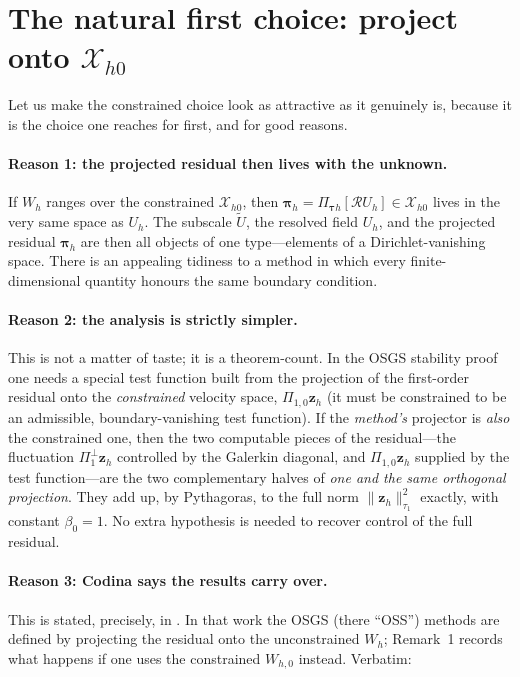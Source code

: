 \documentclass[11pt]{article}
\newcommand{\bz}{\boldsymbol{z}}
\newcommand{\bpi}{\boldsymbol{\pi}}
\newcommand{\Rop}{\mathcal{R}}
\newcommand{\Xhz}{\mathcal{X}_{h0}}
\newcommand{\Ponez}{\Pi_{1,0}}
\newcommand{\Poneperp}{\Pi_{1}^{\perp}}
\newcommand{\Ptauh}{\Pi_{\bm{\tau}h}}
\newcommand{\Uh}{U_{h}}
\newcommand{\Util}{\widetilde{U}}
\newcommand{\normtau}[1]{\lVert #1 \rVert_{\tau_{1}}}
\theoremstyle{plain}
\theoremstyle{definition}
\theoremstyle{remark}
\begin{document}
\section{The natural first choice: project onto \texorpdfstring{$\Xhz$}{Xh0}}
\label{sec:natural}

Let us make the constrained choice look as attractive as it genuinely
is, because it is the choice one reaches for first, and for good
reasons.

\paragraph{Reason 1: the projected residual then lives with the unknown.}
If $W_h$ ranges over the constrained $\Xhz$, then
$\bpi_h=\Ptauh[\Rop U_h]\in\Xhz$ lives in the very same space as $\Uh$.
The subscale $\Util$, the resolved field $\Uh$, and the projected
residual $\bpi_h$ are then all objects of one type---elements of a
Dirichlet-vanishing space. There is an appealing tidiness to a method in
which every finite-dimensional quantity honours the same boundary
condition.

\paragraph{Reason 2: the analysis is strictly simpler.}
This is not a matter of taste; it is a theorem-count. In the OSGS
stability proof one needs a special test function built from the
projection of the first-order residual onto the \emph{constrained}
velocity space, $\Ponez\bz_h$ (it must be constrained to be an
admissible, boundary-vanishing test function). If the \emph{method's}
projector is \emph{also} the constrained one, then the two computable
pieces of the residual---the fluctuation $\Poneperp\bz_h$ controlled by
the Galerkin diagonal, and $\Ponez\bz_h$ supplied by the test
function---are the two complementary halves of \emph{one and the same
orthogonal projection}. They add up, by Pythagoras, to the full norm
$\normtau{\bz_h}^2$ exactly, with constant $\beta_0=1$. No extra
hypothesis is needed to recover control of the full residual.

\paragraph{Reason 3: Codina says the results carry over.}
This is stated, precisely, in \cite[Remark~1]{codina2008}. In that
work the OSGS (there ``OSS'') methods are defined by projecting the
residual onto the unconstrained $W_h$; Remark~1 records what happens if
one uses the constrained $W_{h,0}$ instead. Verbatim:
\end{document}

